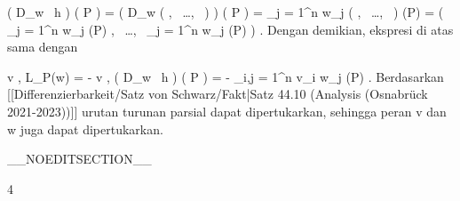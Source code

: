 {\mavergleichskettealignhandlinks
{\vergleichskettealignhandlinks
{ \left(  D_{w}
 \,  h   \right) \left(   P   \right)
}
{ =} { \left(  D_{w}  \left(  {  }   , \,   \ldots  , \,   {  }                 \right)    \right) \left(   P   \right)
}
{ =} { \sum_{j = 1}^n  w_j  {  }  \left(  {  }   , \,   \ldots  , \,   {  }                 \right) (P)
}
{ =} { \left(  \sum_{j = 1}^n  w_j  {  }  {  } (P)   , \,   \ldots  , \,   \sum_{j = 1}^n  w_j  {  }  {  } (P)                 \right)
}
{ } {
}
}
{}
{}{.}
Dengan demikian, ekspresi di atas sama dengan

\mavergleichskettealign
{\vergleichskettealign
{ \left\langle  v  ,  L_P(w)  \right\rangle
}
{ =} { - {  } \left\langle  v  ,  \left(  D_{w}
 \,  h   \right) \left(   P   \right)   \right\rangle
}
{ =} { -  {  }  \sum_{i,j = 1}^n v_i  w_j  {  } {  }  (P)
}
{ } {
}
{ } {
}
}
{}
{}{.}
Berdasarkan
[[Differenzierbarkeit/Satz von Schwarz/Fakt|Satz 44.10 (Analysis (Osnabrück 2021-2023))]]
urutan turunan parsial dapat dipertukarkan, sehingga peran
\mathkor {} {v} {dan} {w} {}
juga dapat dipertukarkan.

 }

__NOEDITSECTION__

{4}

